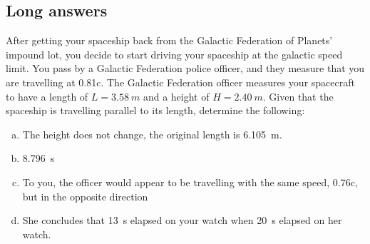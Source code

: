 \subsection{Long answers}
\question After getting your spaceship back from the Galactic Federation of Planets' impound lot, you decide to start driving your spaceship at the galactic speed limit. You pass by a Galactic Federation police officer, and they measure that you are travelling at 0.81c. The Galactic Federation officer measures your spacecraft to have a length of $L = \SI{3.58}{m}$ and a height of $H = \SI{2.40}{m}$. Given that the spaceship is travelling parallel to its length, determine the following:
\begin{finalanswer}
\begin{enumerate}[(a)]
\item The height does not change, the original length is \SI{6.105}{m}.
\item \SI{8.796}{s}
\item To you, the officer would appear to be travelling with the same speed, 0.76c, but in the opposite direction
\item She concludes that \SI{13}{s} elapsed on your watch when \SI{20}{s} elapsed on her watch.
\end{enumerate}
\end{finalanswer}
